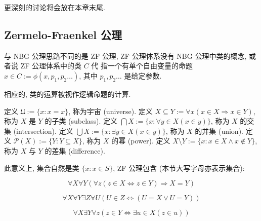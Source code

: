 更深刻的讨论将会放在本章末尾.

\subsection{Zermelo-Fraenkel 公理}

与 NBG 公理思路不同的是 ZF 公理, ZF 公理体系没有 NBG 公理中类的概念, 或者说 ZF 公理体系中的类 \(C\) 代
指一个有单个自由变量的命题 \(x \in C := \phi(x, p_1, p_2 \dots)\), 其中 \(p_1, p_2 \dots\) 是给定参数.

相应的, 类的运算被视作逻辑命题的计算.

\begin{definition}
    \label {definition:ZF universe}
    定义 \(\mathfrak{U} := \{x : x = x\}\), 称为宇宙 (universe).
    \label {definition:ZF subclass}
    定义 \(X \subseteq Y := \forall x (x \in X \Rightarrow x \in Y)\), 称为 \(X\) 是 \(Y\) 的子类 (subclass).
    \label {definition:ZF class intersection}
    定义 \(\bigcap X := \{x : \forall y \in X (x \in y)\}\), 称为 \(X\) 的交集 (intersection).
    \label {definition:ZF class union}
    定义 \(\bigcup X := \{x : \exists y \in X (x \in y)\}\), 称为 \(X\) 的并集 (union).
    \label {definition:ZF power class}
    定义 \(\mathcal{P} (X) := \{Y : Y \subseteq X\}\), 称为 \(X\) 的幂 (power).
    \label {definition:ZF class difference}
    定义 \(X \setminus Y := \{x : x \in X \land x \notin Y\}\), 称为 \(X\) 与 \(Y\) 的差集 (difference).
\end{definition}

此意义上, 集合自然是类 \(\{x:x \in S\}\), ZF 公理包含 (本节大写字母亦表示集合):

\begin{axiom*}
    \label {axiom:ZF Axiom of Extensionality}
    \[
        \forall X \forall Y (\forall z (z \in X \Leftrightarrow z \in Y) \Rightarrow X = Y)
    \]
\end{axiom*}

\begin{axiom*}
    \label {axiom:ZF Axiom of Pair}
    \[
        \forall X \forall Y \exists Z \forall U (U \in Z \Leftrightarrow (U = X \lor U = Y))
    \]
\end{axiom*}

\begin{axiom*}
    \label {axiom:ZF Axiom of Union}
    \[
        \forall X \exists Y \forall z (z \in Y \Leftrightarrow \exists u \in X (z \in u))
    \]
\end{axiom*}

